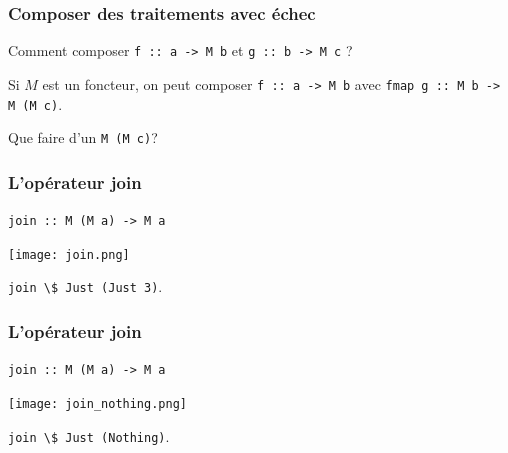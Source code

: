\documentclass{beamer}
\begin{document}
\begin{frame}
\frametitle{Composer des traitements avec échec}
\begin{block}{}
Comment composer \verb!f :: a -> M b! et \verb!g :: b -> M c! ?
\end{block}
\pause
\begin{block}{}
Si $M$ est un foncteur, on peut composer
\verb!f :: a -> M b! avec \verb!fmap g :: M b -> M (M c)!.
\end{block}
\pause
\begin{block}{}
Que faire d'un \verb!M (M c)!?
\end{block}

\end{frame}

\begin{frame}
\frametitle{L'opérateur join}
\begin{block}{}
\begin{center}
\verb!join :: M (M a) -> M a!
\end{center}
\end{block}

\begin{center}
\texttt{[image: join.png]}
\end{center}
\pause
\begin{exampleblock}{}
\begin{center}
\verb!join \$ Just (Just 3)!.
\end{center}
\end{exampleblock}
\end{frame}


\begin{frame}
\frametitle{L'opérateur join}
\begin{block}{}
\begin{center}
\verb!join :: M (M a) -> M a!
\end{center}
\end{block}
\medskip
\begin{center}
\texttt{[image: join\_nothing.png]}
\end{center}
\medskip
\pause
\begin{exampleblock}{}
\begin{center}
\verb!join \$ Just (Nothing)!.
\end{center}
\end{exampleblock}
\end{frame}
\end{document}
